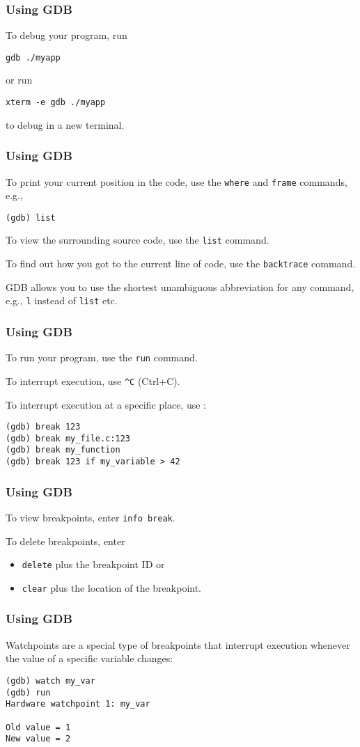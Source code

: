 \documentclass[12pt,t]{beamer}
\let\emph\relax %
\newcommand{\cmd}[1]{\begin{center}\texttt{#1}\end{center}}
\begin{document}
  \begin{frame}[fragile]
    \frametitle{Using GDB}

    To debug your program, run
    \cmd{gdb ./myapp}
    or run
    \cmd{xterm -e gdb ./myapp}
    to debug in a new terminal.
  \end{frame}

  \begin{frame}[fragile]
    \frametitle{Using GDB}

    To print your current position in the code, use the \texttt{where} and \texttt{frame} commands, e.g.,
    \cmd{(gdb) list}

    To view the surrounding source code, use the \texttt{list} command.

    To find out how you got to the current line of code, use the \texttt{backtrace} command.

    \emph{Note:} GDB allows you to use the shortest unambiguous abbreviation for any command, e.g., \texttt{l} instead of \texttt{list} etc.
  \end{frame}

  \begin{frame}[fragile]
    \frametitle{Using GDB}
    
    To run your program, use the \texttt{run} command.

    To interrupt execution, use \texttt{\^{}C} (Ctrl+C).

    To interrupt execution at a specific place, use \emph{breakpoints}:

    \texttt{(gdb) break 123\\(gdb) break my\_file.c:123\\(gdb) break my\_function\\(gdb) break 123 if my\_variable > 42}
  \end{frame}

  \begin{frame}[fragile]
    \frametitle{Using GDB}
    
    To view breakpoints, enter \texttt{info break}.

    To delete breakpoints, enter
    \begin{itemize}
      \item \texttt{delete} plus the breakpoint ID or
      \item \texttt{clear} plus the location of the breakpoint.
    \end{itemize}
  \end{frame}

  \begin{frame}[fragile]
    \frametitle{Using GDB}
    
    Watchpoints are a special type of breakpoints that interrupt execution whenever the value of a specific variable changes:

    \texttt{(gdb) watch my\_var\\(gdb) run\\Hardware watchpoint 1: my\_var\\\ \\Old value = 1\\New value = 2}
  \end{frame}
\end{document}
